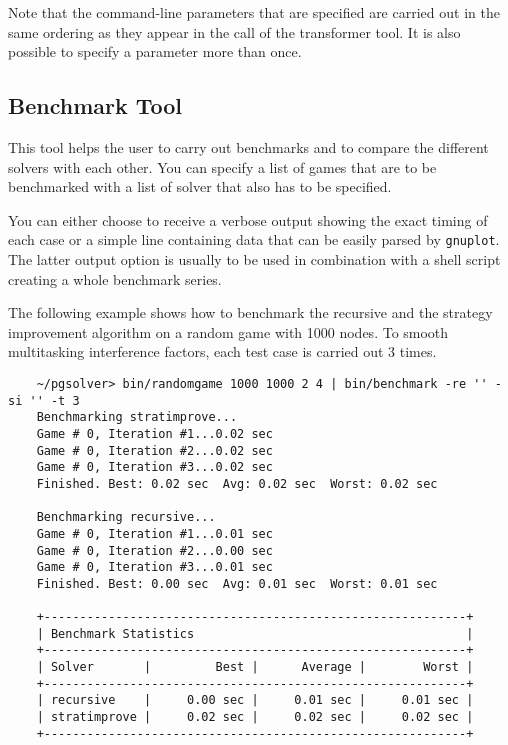Note that the command-line parameters that are specified are carried out in the same ordering as they
appear in the call of the transformer tool. It is also possible to specify a parameter more than once.


\subsection{Benchmark Tool}

This tool helps the user to carry out benchmarks and to compare the different solvers with each other. 
You can specify a list of games that are to be benchmarked with a list of solver that also has to be 
specified.

You can either choose to receive a verbose output showing the exact timing of each case or a simple line 
containing data that can be easily parsed by \texttt{gnuplot}. The latter output option is usually to be 
used in combination with a shell script creating a whole benchmark series.

\begin{example}
The following example shows how to benchmark the recursive and the strategy improvement algorithm on a 
random game with 1000 nodes. To smooth multitasking interference factors, each test case is carried out 
3 times.
\begin{verbatim}
    ~/pgsolver> bin/randomgame 1000 1000 2 4 | bin/benchmark -re '' -si '' -t 3
    Benchmarking stratimprove...
    Game # 0, Iteration #1...0.02 sec
    Game # 0, Iteration #2...0.02 sec
    Game # 0, Iteration #3...0.02 sec
    Finished. Best: 0.02 sec  Avg: 0.02 sec  Worst: 0.02 sec

    Benchmarking recursive...
    Game # 0, Iteration #1...0.01 sec
    Game # 0, Iteration #2...0.00 sec
    Game # 0, Iteration #3...0.01 sec
    Finished. Best: 0.00 sec  Avg: 0.01 sec  Worst: 0.01 sec

    +-----------------------------------------------------------+
    | Benchmark Statistics                                      |
    +-----------------------------------------------------------+
    | Solver       |         Best |      Average |        Worst |
    +-----------------------------------------------------------+
    | recursive    |     0.00 sec |     0.01 sec |     0.01 sec |
    | stratimprove |     0.02 sec |     0.02 sec |     0.02 sec |
    +-----------------------------------------------------------+
\end{verbatim}
\end{example}

